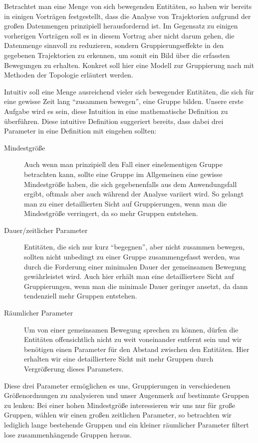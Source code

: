 Betrachtet man eine Menge von sich bewegenden Entitäten, so haben wir bereits in einigen Vorträgen festgestellt, dass die Analyse von Trajektorien aufgrund der großen Datenmengen prinzipiell herausfordernd ist.
Im Gegensatz zu einigen vorherigen Vorträgen soll es in diesem Vortrag aber nicht darum gehen, die Datenmenge sinnvoll zu reduzieren, sondern Gruppierungseffekte in den gegebenen Trajektorien zu erkennen, um somit ein Bild über die erfassten Bewegungen zu erhalten.
Konkret soll hier eine Modell zur Gruppierung nach \textcite{buchin2015} mit Methoden der Topologie erläutert werden.

Intuitiv soll eine Menge ausreichend vieler sich bewegender Entitäten, die sich für eine gewisse Zeit lang \enquote{zusammen bewegen}, eine Gruppe bilden.
Unsere erste Aufgabe wird es sein, diese Intuition in eine mathematische Definition zu überführen.
Diese intuitive Definition suggeriert bereits, dass dabei drei Parameter in eine Definition mit eingehen sollten:
\begin{description}
	\item[Mindestgröße] Auch wenn man prinzipiell den Fall einer einelementigen Gruppe betrachten kann, sollte eine Gruppe im Allgemeinen eine gewisse Mindestgröße haben, die sich gegebenenfalls aus dem Anwendungsfall ergibt, oftmals aber auch während der Analyse variiert wird.
	So gelangt man zu einer detaillierten Sicht auf Gruppierungen, wenn man die Mindestgröße verringert, da so mehr Gruppen entstehen.
	\item[Dauer/zeitlicher Parameter] Entitäten, die sich nur kurz \enquote{begegnen}, aber nicht zusammen bewegen, sollten nicht unbedingt zu einer Gruppe zusammengefasst werden, was durch die Forderung einer minimalen Dauer der gemeinsamen Bewegung gewährleistet wird.
	Auch hier erhält man eine detailliertere Sicht auf Gruppierungen, wenn man die minimale Dauer geringer ansetzt, da dann tendenziell mehr Gruppen entstehen.
	\item[Räumlicher Parameter] Um von einer gemeinsamen Bewegung sprechen zu können, dürfen die Entitäten offensichtlich nicht zu weit voneinander entfernt sein und wir benötigen einen Parameter für den Abstand zwischen den Entitäten.
	Hier erhalten wir eine detailliertere Sicht mit mehr Gruppen durch Vergrößerung dieses Parameters.
\end{description}
Diese drei Parameter ermöglichen es uns, Gruppierungen in verschiedenen Größenordnungen zu analysieren und unser Augenmerk auf bestimmte Gruppen zu lenken: Bei einer hohen Mindestgröße interessieren wir uns nur für große Gruppen, wählen wir einen großen zeitlichen Parameter, so betrachten wir lediglich lange bestehende Gruppen und ein kleiner räumlicher Parameter filtert lose zusammenhängende Gruppen heraus.


